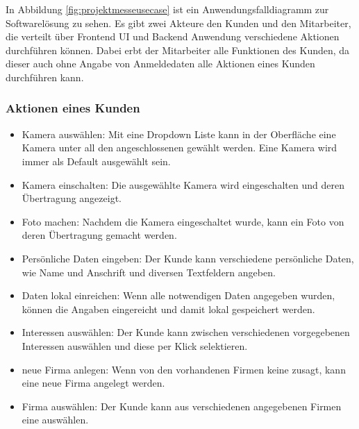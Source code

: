 In Abbildung \ref{fig:projektmesseusecase} ist ein Anwendungsfalldiagramm zur Softwarelösung zu sehen. Es gibt zwei Akteure den Kunden und den Mitarbeiter, die verteilt über Frontend UI und Backend Anwendung verschiedene Aktionen durchführen können. Dabei erbt der Mitarbeiter alle Funktionen des Kunden, da dieser auch ohne Angabe von Anmeldedaten alle Aktionen eines Kunden durchführen kann.

\subsubsection{Aktionen eines Kunden}
\begin{itemize}
	\item Kamera auswählen: Mit eine Dropdown Liste kann in der Oberfläche eine Kamera unter all den angeschlossenen gewählt werden. Eine Kamera wird immer als Default ausgewählt sein.
	\item Kamera einschalten: Die ausgewählte Kamera wird eingeschalten und deren Übertragung angezeigt.
	\item Foto machen: Nachdem die Kamera eingeschaltet wurde, kann ein Foto von deren Übertragung gemacht werden.
	\item Persönliche Daten eingeben: Der Kunde kann verschiedene persönliche Daten, wie Name und Anschrift und diversen Textfeldern angeben.
	\item Daten lokal einreichen: Wenn alle notwendigen Daten angegeben wurden, können die Angaben eingereicht und damit lokal gespeichert werden.
	\item Interessen auswählen: Der Kunde kann zwischen verschiedenen vorgegebenen Interessen auswählen und diese per Klick selektieren.
	\item neue Firma anlegen: Wenn von den vorhandenen Firmen keine zusagt, kann eine neue Firma angelegt werden.
	\item Firma auswählen: Der Kunde kann aus verschiedenen angegebenen Firmen eine auswählen.
\end{itemize}

